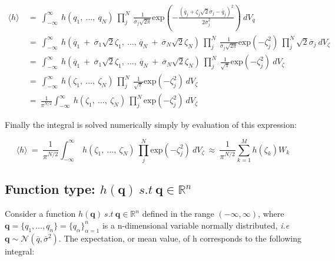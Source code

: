 \documentclass{article}
\begin{document}
\begin{equation}
    \begin{split}
        \langle h \rangle\ &=\ \int^{\infty}_{-\infty}\ h(q_1,\ \ldots,\ q_N)\ \prod_{j}^{N}\ \frac{1}{\overline{\sigma}_j\sqrt{2\pi}} \text{exp}\left(- \frac{(\overline{q}_j + \zeta_j \sqrt{2}\overline{\sigma}_j - \overline{q}_j)^2}{2 \overline{\sigma}_j^2}\right)\ dV_q \\
        &=\ \int^{\infty}_{-\infty}\ h(\overline{q}_1\ +\ \overline{\sigma}_1\sqrt{2}\zeta_1,\ \ldots,\, \overline{q}_N\ +\ \overline{\sigma}_N\sqrt{2}\zeta_N)\ \prod_{j}^{N}\ \frac{1}{\overline{\sigma}_j\sqrt{2\pi}} \text{exp}\left(- \zeta_j^2 \right)\  \prod_{j}^{N} \sqrt{2}\overline{\sigma}_j\ dV_{\zeta} \\
        &=\ \int^{\infty}_{-\infty}\ h(\overline{q}_1\ +\ \overline{\sigma}_1\sqrt{2}\zeta_1,\ \ldots,\ \overline{q}_N\ +\ \overline{\sigma}_N\sqrt{2}\zeta_N)\ \prod_{j}^{N}\ \frac{1}{\sqrt{\pi}} \text{exp}\left(- \zeta_j^2\right)\ dV_{\zeta} \\ 
        &=\ \int^{\infty}_{-\infty}\ h(\zeta_1,\ \ldots,\ \zeta_N)\ \prod_{j}^{N}\ \frac{1}{\sqrt{\pi}} \text{exp}\left(- \zeta_j^2\right)\ dV_{\zeta} \\
        &=\ \frac{1}{\pi^{N/2}} \int^{\infty}_{-\infty}\ h(\zeta_1,\ \ldots,\ \zeta_N)\  \prod_{j}^{N} \text{exp}\left(- \zeta_j^2\right)\ dV_{\zeta}
    \end{split}
\end{equation}

Finally the integral is solved numerically simply by evaluation of this expression:

\begin{equation}
\langle h \rangle\ =\ \frac{1}{\pi^{N/2}} \int^{\infty}_{-\infty}\ h(\zeta_1,\ \ldots,\ \zeta_N)\  \prod_{j}^{N} \text{exp}\left(- \zeta_j^2\right)\ dV_{\zeta}\ \approx\ \frac{1}{\pi^{N/2}} \sum_{k=1}^M h(\zeta_k)W_k
\end{equation}


\subsection{Function type: $h(\mathbf{q})\ s.t\ \mathbf{q} \in \mathbb{R}^n$}

Consider a function $h(\mathbf{q})\ s.t\ \mathbf{q} \in \mathbb{R}^n$ defined in the range $(-\infty , \infty)$, where $\mathbf{q} = \{q_1, \ldots, q_n \} = \{q_\alpha\}_{\alpha = 1}^{n}$ is a n-dimensional variable normally distributed, {\it i.e} $\mathbf{q} \sim \mathcal{N}(\overline{q} , \overline{\sigma}^{2})$. The expectation, or mean value, of h corresponds to the following integral:
\end{document}
